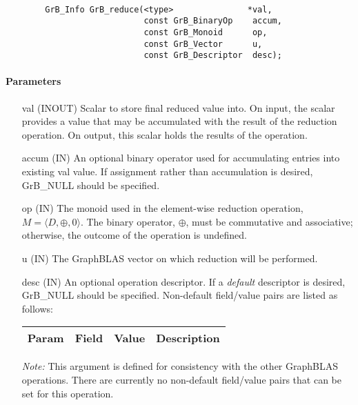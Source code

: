\paragraph{\syntax}

\begin{verbatim}
        GrB_Info GrB_reduce(<type>               *val,
                            const GrB_BinaryOp    accum,
                            const GrB_Monoid      op,
                            const GrB_Vector      u,
                            const GrB_Descriptor  desc);
\end{verbatim}

\paragraph{Parameters}

\begin{itemize}[leftmargin=1.1in]
    \item[{\sf val}]    ({\sf INOUT}) Scalar to store final reduced value into. On input,
    the scalar provides a value that may be accumulated with the result of the
    reduction operation.  On output, this scalar holds the results of the
    operation.

    \item[{\sf accum}] ({\sf IN}) An optional binary operator used for accumulating
    entries into existing {\sf val} value. If assignment rather than accumulation is
    desired, {\sf GrB\_NULL} should be specified.

    \item[{\sf op}]    ({\sf IN}) The monoid used in the element-wise reduction
    operation, $M = \langle D,\oplus,0 \rangle$. The binary operator,
    $\oplus$, must be commutative and associative; otherwise,
    the outcome of the operation is undefined.
    
    \item[{\sf u}]     ({\sf IN}) The GraphBLAS vector on which
    reduction will be performed.

    \item[{\sf desc}] ({\sf IN}) An optional operation descriptor. If
    a \emph{default} descriptor is desired, {\sf GrB\_NULL} should be
    specified. Non-default field/value pairs are listed as follows:  \\

    \begin{tabular}{lllp{2.5in}}
        Param & Field  & Value & Description \\
        \hline
    \end{tabular}

    \emph{Note:} This argument is defined for consistency with the other GraphBLAS operations.
    There are currently no non-default field/value pairs that can be set for this operation.
\end{itemize}

